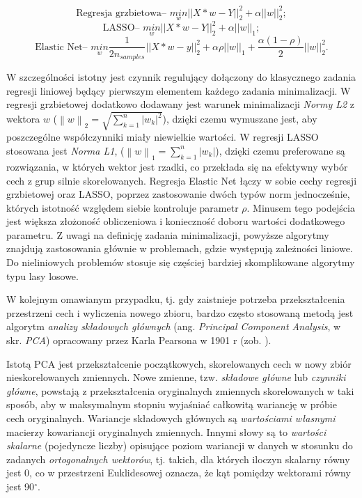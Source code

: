 \begin{equation}
\textrm{Regresja grzbietowa-- } \underset{w}{min} ||X*w-Y||_2^2 + \alpha ||w||_2^2;
\label{equ:ridgeReg}
\end{equation}
\begin{equation}
\textrm{LASSO-- } \underset{w}{min} ||X*w-Y||_2^2 + \alpha ||w||_1;
\label{equ:lassoReg}
\end{equation}
\begin{equation}
\textrm{Elastic Net-- } \underset{w}{min} { \frac{1}{2n_{samples}} ||X*w - y||_2 ^ 2 + \alpha \rho ||w||_1 + \frac{\alpha(1-\rho)}{2} ||w||_2 ^ 2}.
\label{equ:elasticNet}
\end{equation}

W szczególności istotny jest czynnik regulujący dołączony do klasycznego zadania regresji liniowej będący pierwszym elementem każdego zadania minimalizacji. W regresji grzbietowej dodatkowo dodawany jest warunek minimalizacji \textit{Normy L2} z wektora $w$ ($\left \| w \right \|_2 =\sqrt{ \sum_{k=1}^{n}\left |w_k  \right |^2}$), dzięki czemu wymuszane jest, aby poszczególne współczynniki miały niewielkie wartości. W regresji LASSO stosowana jest \textit{Norma L1}, ($\left \| w \right \|_1 = \sum_{k=1}^{n}\left |w_k  \right |$), dzięki czemu preferowane są rozwiązania, w których wektor jest rzadki, co przekłada się na efektywny wybór cech z grup silnie skorelowanych. Regresja Elastic Net łączy w sobie cechy regresji grzbietowej oraz LASSO, poprzez zastosowanie dwóch typów norm jednocześnie, których istotność względem siebie kontroluje parametr $\rho$. Minusem tego podejścia jest większa złożoność obliczeniowa i konieczność doboru wartości dodatkowego parametru. Z uwagi na definicję zadania minimalizacji, powyższe algorytmy znajdują zastosowania głównie w problemach, gdzie występują zależności liniowe. Do nieliniowych problemów stosuje się częściej bardziej skomplikowane algorytmy typu lasy losowe.

W kolejnym omawianym przypadku, tj. gdy zaistnieje potrzeba przekształcenia przestrzeni cech i wyliczenia nowego zbioru, bardzo często stosowaną metodą jest algorytm \textit{analizy składowych głównych} (ang. \textit{Principal Component Analysis}, w skr. \textit{PCA}) opracowany przez Karla Pearsona w 1901 r (zob. \cite{PCA}).  

Istotą PCA jest przekształcenie początkowych, skorelowanych cech w nowy zbiór nieskorelowanych zmiennych. Nowe zmienne, tzw. \textit{składowe główne} lub \textit{czynniki główne}, powstają z przekształcenia oryginalnych zmiennych skorelowanych w taki sposób, aby w maksymalnym stopniu wyjaśniać całkowitą wariancję w próbie cech oryginalnych. Wariancje składowych głównych są \textit{wartościami własnymi} macierzy kowariancji oryginalnych zmiennych. Innymi słowy są to \textit{wartości skalarne} (pojedyncze liczby) opisujące poziom wariancji w danych w stosunku do zadanych \textit{ortogonalnych wektorów}, tj. takich, dla których iloczyn skalarny równy jest 0, co \linebreak w przestrzeni Euklidesowej oznacza, że kąt pomiędzy wektorami równy jest 90$^\circ$.

